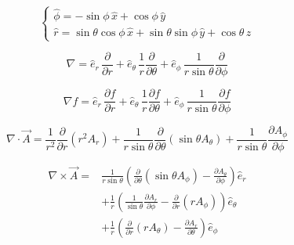 \begin{enumerate}
\[\begin{cases}
\hat{\phi} =
-\sin\phi\,\hat{x}+
\cos\phi\,\hat{y}\\[6pt]

\hat{r} =
\sin\theta\cos\phi\,\hat{x}+
\sin\theta\sin\phi\,\hat{y}+
\cos\theta\,\hat{z}
\end{cases}
\]

\[
\nabla
=
\hat{e}_r\,\frac{\partial}{\partial r}
+\hat{e}_\theta\,\frac{1}{r}\frac{\partial}{\partial \theta}
+\hat{e}_\phi\,\frac{1}{r\sin\theta}\frac{\partial}{\partial \phi}
\]

\[
\nabla f
=
\hat{e}_r\,\frac{\partial f}{\partial r}
+\hat{e}_\theta\,\frac{1}{r}\frac{\partial f}{\partial \theta}
+\hat{e}_\phi\,\frac{1}{r\sin\theta}\frac{\partial f}{\partial \phi}
\]

\[
\nabla\cdot \vec{A}
=
\frac{1}{r^2}\frac{\partial}{\partial r}\left(r^2 A_r\right)
+\frac{1}{r\sin\theta}\frac{\partial}{\partial \theta}\left(\sin\theta A_\theta\right)
+\frac{1}{r\sin\theta}\frac{\partial A_\phi}{\partial \phi}
\]

\begin{align*}
\nabla\times \vec{A} ={}& \frac{1}{r\sin\theta}\left(\frac{\partial}{\partial \theta}(\sin\theta A_\phi) - \frac{\partial A_\theta}{\partial \phi}\right)\hat{e}_r \\
&+ \frac{1}{r}\left(\frac{1}{\sin\theta}\frac{\partial A_r}{\partial \phi} - \frac{\partial}{\partial r}(rA_\phi)\right)\hat{e}_\theta \\
&+ \frac{1}{r}\left(\frac{\partial}{\partial r}(rA_\theta) - \frac{\partial A_r}{\partial \theta}\right)\hat{e}_\phi
\end{align*}
\end{enumerate}

